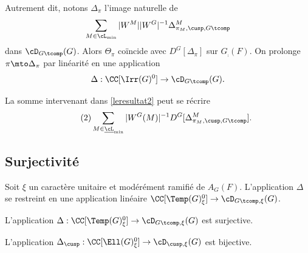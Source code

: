 Autrement dit, notons $\Delta_{\pi}$ l'image naturelle de
\[
\sum_{M\in \cL_{\min}}\vert W^M\vert \vert W^G\vert ^{-1}\Delta^M_{\pi_{M},\cusp,G\tcomp}
\]
dans $\cD_{G\tcomp}(G)$. Alors $\Theta_{\pi}$ coïncide avec $D^G[\Delta_{\pi}]$ sur $G_{\comp}(F)$. On prolonge $\pi\mto \Delta_{\pi}$ par linéarité en une application
\[
\Delta:\CC[\Irr(G)^0]\to \cD_{G\tcomp}(G).
\]

\begin{rem*}
La somme intervenant dans \eqref{leresultat2} peut se récrire
\begin{equation}\tag{2}\label{leresultat2}
\sum_{M\in \underline{\cL}_{\min}}\vert W^G(M)\vert ^{-1}D^G[\Delta^M_{\pi_{M},\cusp,G\tcomp}].
\end{equation}
\end{rem*}

\subsection{Surjectivité}\label{surjectivite}

Soit $\xi$ un caractère unitaire et modérément ramifié de $A_{G}(F)$. L'application $\Delta$ se restreint en une application linéaire $\CC[\Temp(G)_{\xi}^0]\to \cD_{G\tcomp,\xi}(G)$.

\skpt
\begin{lem*}
\begin{enumeratei}
\item\label{surjectivitei}
L'application $\Delta:\CC[\Temp(G)_{\xi}^0]\to \cD_{G\tcomp,\xi}(G)$ est surjective.

\item\label{surjectiviteii}
L'application $\Delta_{\cusp}:\CC[\Ell(G)_{\xi}^0]\to \cD_{\cusp,\xi}(G)$ est bijective.
\end{enumeratei}
\end{lem*}

